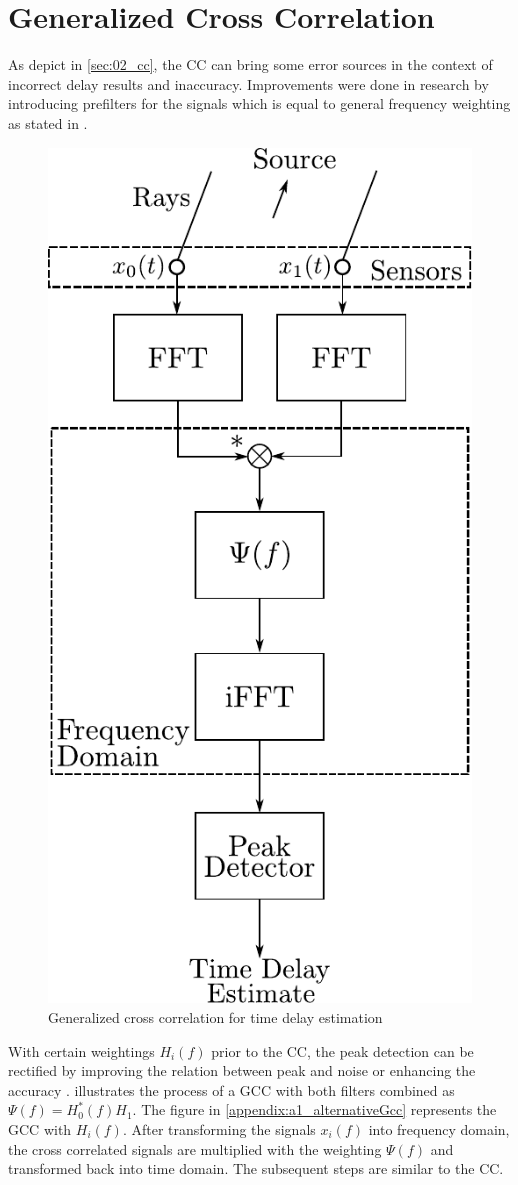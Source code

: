 \section{Generalized Cross Correlation}
\label{sec:02_gcc}

As depict in \cref{sec:02_cc}, the \ac{CC} can bring some error sources in the context of
incorrect delay results and inaccuracy.
Improvements were done in research by introducing prefilters for the signals
which is equal to general frequency weighting as stated in \cite{K_C_GCC}.
\begin{figure}[ht]
	\centering
		\includegraphics[width=0.35\columnwidth]{figures/GCC_weight}
	\caption{Generalized cross correlation for time delay estimation}
    \label{fig:02_GCC}
\end{figure}
With certain weightings $H_i(f)$ prior to the \ac{CC}, the peak detection
can be rectified by improving the relation between peak and noise or
enhancing the accuracy \cite{H_B_GCC}.
 illustrates the process of a \ac{GCC} with both filters combined as
$\Psi(f) = H_0^*(f)H_1$. The figure in \cref{appendix:a1_alternativeGcc} represents the
\ac{GCC} with $H_i(f)$.
After transforming the signals $x_i(f)$ into frequency domain, the cross correlated
signals are multiplied with the weighting $\Psi(f)$ and transformed back into time domain.
The subsequent steps are similar to the \ac{CC}.

